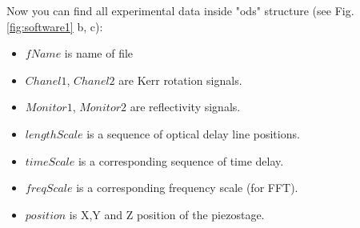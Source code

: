 \documentclass[14pt,a4paper] {article}
\begin{document}
\begin{enumerate}
Now you can find all experimental data inside "ods" structure (see Fig. \ref{fig:software1} b, c):     
\begin{itemize}
\item $fName$ is name of file
\item $Chanel1$, $Chanel2$ are Kerr rotation signals.
\item $Monitor1$, $Monitor2$ are reflectivity signals.
\item $lengthScale$ is a sequence of optical delay line positions.
\item $timeScale$ is a corresponding sequence of time delay.
\item $freqScale$ is a corresponding frequency scale (for FFT).
\item $position$ is X,Y and Z position of the piezostage. 
\end{itemize}     
            
\end{enumerate}

  
\end{document}

